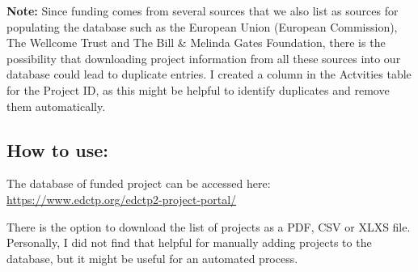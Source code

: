 \documentclass[
]{book}
\begin{document}
\textbf{Note:} Since funding comes from several sources that we also list as sources for populating the database such as the European Union (European Commission), The Wellcome Trust and The Bill \& Melinda Gates Foundation, there is the possibility that downloading project information from all these sources into our database could lead to duplicate entries. I created a column in the Actvities table for the Project ID, as this might be helpful to identify duplicates and remove them automatically.

\hypertarget{how-to-use-1}{%
\subsection{How to use:}\label{how-to-use-1}}

The database of funded project can be accessed here: \url{https://www.edctp.org/edctp2-project-portal/}

There is the option to download the list of projects as a PDF, CSV or XLXS file. Personally, I did not find that helpful for manually adding projects to the database, but it might be useful for an automated process.
\end{document}

